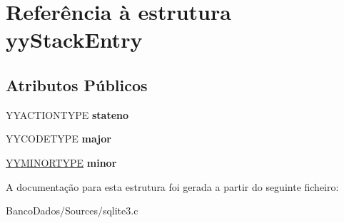 \hypertarget{structyy_stack_entry}{\section{Referência à estrutura yy\-Stack\-Entry}
\label{structyy_stack_entry}
}
\subsection*{Atributos Públicos}
\begin{DoxyCompactItemize}
\item 
\hypertarget{structyy_stack_entry_a108164609c2e841577cc3533d8f0180d}{Y\-Y\-A\-C\-T\-I\-O\-N\-T\-Y\-P\-E {\bfseries stateno}}\label{structyy_stack_entry_a108164609c2e841577cc3533d8f0180d}

\item 
\hypertarget{structyy_stack_entry_a7624d02bcf945d48068f4c383551725c}{Y\-Y\-C\-O\-D\-E\-T\-Y\-P\-E {\bfseries major}}\label{structyy_stack_entry_a7624d02bcf945d48068f4c383551725c}

\item 
\hypertarget{structyy_stack_entry_a024e1e64bce5945080629a2dd8d1bb4f}{\hyperlink{union_y_y_m_i_n_o_r_t_y_p_e}{Y\-Y\-M\-I\-N\-O\-R\-T\-Y\-P\-E} {\bfseries minor}}\label{structyy_stack_entry_a024e1e64bce5945080629a2dd8d1bb4f}

\end{DoxyCompactItemize}


A documentação para esta estrutura foi gerada a partir do seguinte ficheiro\-:\begin{DoxyCompactItemize}
\item 
Banco\-Dados/\-Sources/sqlite3.\-c\end{DoxyCompactItemize}
